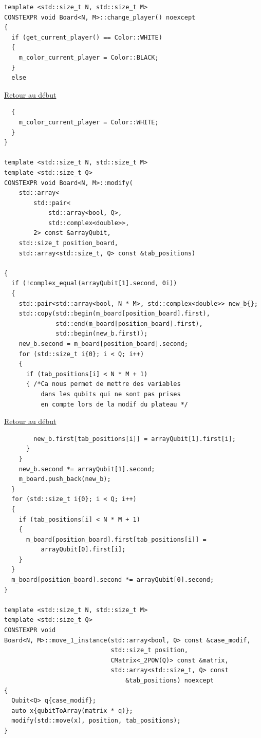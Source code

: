 {\begin{frame}[fragile]
\begin{verbatim}
template <std::size_t N, std::size_t M>
CONSTEXPR void Board<N, M>::change_player() noexcept
{
  if (get_current_player() == Color::WHITE)
  {
    m_color_current_player = Color::BLACK;
  }
  else
\end{verbatim}
\end{frame}

\begin{frame}[fragile]
\hyperlink{conclusion}{Retour au début}\newline
\begin{verbatim}
  {
    m_color_current_player = Color::WHITE;
  }
}

template <std::size_t N, std::size_t M>
template <std::size_t Q>
CONSTEXPR void Board<N, M>::modify(
    std::array<
        std::pair<
            std::array<bool, Q>,
            std::complex<double>>,
        2> const &arrayQubit,
    std::size_t position_board,
    std::array<std::size_t, Q> const &tab_positions)

{
  if (!complex_equal(arrayQubit[1].second, 0i))
  {
    std::pair<std::array<bool, N * M>, std::complex<double>> new_b{};
    std::copy(std::begin(m_board[position_board].first),
              std::end(m_board[position_board].first),
              std::begin(new_b.first));
    new_b.second = m_board[position_board].second;
    for (std::size_t i{0}; i < Q; i++)
    {
      if (tab_positions[i] < N * M + 1)
      { /*Ca nous permet de mettre des variables
          dans les qubits qui ne sont pas prises
          en compte lors de la modif du plateau */
\end{verbatim}
\end{frame}

\begin{frame}[fragile]
\hyperlink{conclusion}{Retour au début}\newline
\begin{verbatim}
        new_b.first[tab_positions[i]] = arrayQubit[1].first[i];
      }
    }
    new_b.second *= arrayQubit[1].second;
    m_board.push_back(new_b);
  }
  for (std::size_t i{0}; i < Q; i++)
  {
    if (tab_positions[i] < N * M + 1)
    {
      m_board[position_board].first[tab_positions[i]] =
          arrayQubit[0].first[i];
    }
  }
  m_board[position_board].second *= arrayQubit[0].second;
}

template <std::size_t N, std::size_t M>
template <std::size_t Q>
CONSTEXPR void
Board<N, M>::move_1_instance(std::array<bool, Q> const &case_modif,
                             std::size_t position,
                             CMatrix<_2POW(Q)> const &matrix,
                             std::array<std::size_t, Q> const
                                 &tab_positions) noexcept
{
  Qubit<Q> q{case_modif};
  auto x{qubitToArray(matrix * q)};
  modify(std::move(x), position, tab_positions);
}
\end{verbatim}
\end{frame}

}

